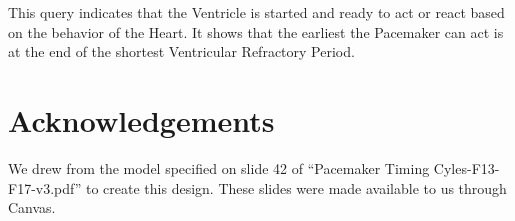 \documentclass[10pt]{article}
\begin{document}
		This query indicates that the Ventricle is started and ready to act or react based on the behavior of the Heart. It shows that the earliest the Pacemaker can act is at the end of the shortest Ventricular Refractory Period.

\section{Acknowledgements}

	We drew from the model specified on slide 42 of ``Pacemaker Timing Cyles-F13-F17-v3.pdf'' to create this design. These slides were made available to us through Canvas.
	
\end{document}
